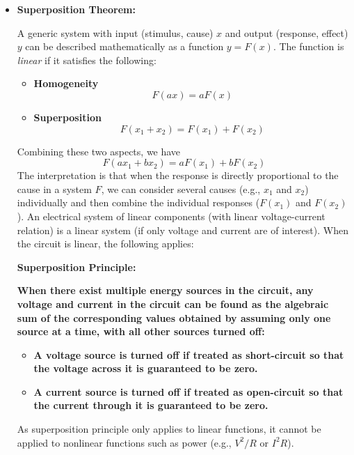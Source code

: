\documentclass{article}
\begin{document}
\begin{itemize}
\item {\bf Superposition Theorem:}

A generic system with input (stimulus, cause) $x$ and output (response,
effect) $y$ can be described mathematically as a function $y=F(x)$. 
The function is {\em linear} if it satisfies the following:
\begin{itemize}
\item {\bf Homogeneity}
  \begin{equation}
    F(ax)=aF(x) 
  \end{equation}
\item {\bf Superposition}
  \begin{equation} 
    F(x_1+x_2)=F(x_1)+F(x_2)	
  \end{equation}
\end{itemize}
Combining these two aspects, we have
\begin{equation}
  F(ax_1+bx_2)=aF(x_1)+bF(x_2)	
\end{equation}
The interpretation is that when the response is directly proportional to 
the cause in a system $F$, we can consider several causes (e.g., $x_1$ 
and $x_2$) individually and then combine the individual responses ($F(x_1)$ 
and $F(x_2)$). An electrical system of linear components (with linear 
voltage-current relation) is a linear system (if only voltage and current 
are of interest). When the circuit is linear, the following applies:

{\bf Superposition Principle:}

{\bf When there exist multiple energy sources in the circuit, any voltage 
  and current in the circuit can be found as the algebraic sum of the 
  corresponding values obtained by assuming only one source at a time,
  with all other sources turned off:}
\begin{itemize}
\item {\bf A voltage source is turned off if treated as short-circuit so 
  that the voltage across it is guaranteed to be zero.}
\item {\bf A current source is turned off if treated as open-circuit so 
  that the current through it is guaranteed to be zero.}
\end{itemize}

As superposition principle only applies to linear functions, it cannot be
applied to nonlinear functions such as power (e.g., $V^2/R$ or $I^2R$). 



\end{itemize}
\end{document}

